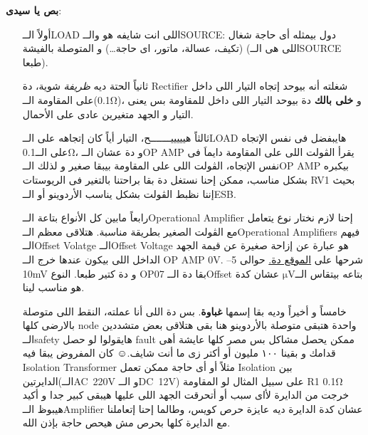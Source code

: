 \documentclass{article}
\begin{document}
\textbf{بص يا سيدى}:
\begin{enumerate}
    \item[أولاً] 
    الــ\textenglish{LOAD} اللى انت شايفه هو والــ\textenglish{SOURCE}:
    دول بيمثله أى حاجة شغال (تكيف، عسالة، ماتور، اى  حاجة\ldots )
    و المتوصلة بالفيشة (اللى هى الــ\textenglish{SOURCE} طبعا).

    \item[ثانياً] 
    الحتة ديه \textit{ظريفة} شوية، 
    دة \textenglish{Rectifier} شغلته أنه بيوحد إتجاه التيار اللى داخل على
    المقاومة الــ(\textenglish{0.1Ω})، و \textbf{خلى بالك} دة بيوحد التيار اللى داخل للمقاومة بس يعنى التيار و الجهد متغيرين عادى على الأحمال.

    \item[ثالثاً]
    {\large هيييييـــــــح}، \quad التيار أياً كان إتجاهه على الــ\textenglish{LOAD} 
    هايبفضل فى نفس الإتجاه على الــ\textenglish{0.1Ω}،
    و دة عشان الــ\textenglish{OP AMP} يقرأ الڤولت اللى على المقاومة دايماَ فى نفس الإتجاه، 
    الڤولت اللى على المقاومة بيبقا صغير و لذلك الــ\textenglish{OP AMP} 
    بيكبره بشكل مناسب، ممكن إحنا نستغل دة بقا براحتنا بالتغير فى الريوستات \textenglish{RV1} بحيث إننا نظبط الڤولت بشكل يناسب الأردوينو أو الــ\textenglish{ESB}.

    \item[رابعاً] 
    مابين كل الأنواع بتاعة الــ\textenglish{Operational Amplifier}
    إحنا لازم نختار نوع يتعامل مع الڤولت الصغير بطريقة مناسبة. هتلاقى معظم الــ\textenglish{Operational Amplifiers} 
    فيهم الــ\textenglish{Offset Volatge}\RTLfootnote%
    {الــ\textenglish{Offset Voltage} هو عبارة عن إزاحة صغيرة عن قيمة الجهد الداخل اللى بيكون عندها خرج الــ \textenglish{OP AMP} \textenglish{0V}. 
    شرحها على \hyperref{https://toshiba.semicon-storage.com/ap-en/semiconductor/knowledge/faq/linear_opamp/what-is-the-input-offset-voltage-of-an-op-amp.html}{}{}{ الموقع دة.}}
    حوالى \textenglish{5–10mV} و دة كتير طبعا.
    النوع \textenglish{OP07} بقا دة الــ\textenglish{Offset} بتاعه بيتقاس الــ\textenglish{$\mathrm{\mu V}$}
    عشان كدة هو مناسب لينا.

    \item[خامساً و أخيراً] 
    وديه بقا إسمها {\Large \textbf{غباوة}}. بس دة اللى أنا عملته، النقط اللى متوصلة بالارضى كلها \textenglish{node} 
    واحدة هتبقى متوصلة بالأردوينو هنا بقى هتلاقى بعض متشددين الــ\textenglish{safety} 
    هايقولوا لو حصل \textenglish{fault} ممكن يحصل مشاكل
    بس مصر كلها عايشة أهى قدامك و بقينا ١٠٠ مليون أو أكتر زى ما أنت شايف.{☺}
    كان المفروض يبقا فيه \textenglish{Isolation Transformer} مثلاً
    أو أى حاجة ممكن تعمل \textenglish{Isolation} بين 
    الدايرتين(الــ\textenglish{AC~220V} و الــ\textenglish{DC~12V})
    على سبيل المثال لو المقاومة \textenglish{R1 0.1Ω} خرجت من الدايرة ﻷاى سبب أو أتحرقت 
    الجهد اللى عليها هيبقى كبير جدا و أكيد هيبوظ الــ\textenglish{Amplifier} 
    عشان كدة الدايرة ديه عايزة حرص كويس، وطالما إحنا إتعاملنا مع الدايرة كلها بحرص مش هيحص حاجة بإذن الله.
\end{enumerate}
\end{document}
